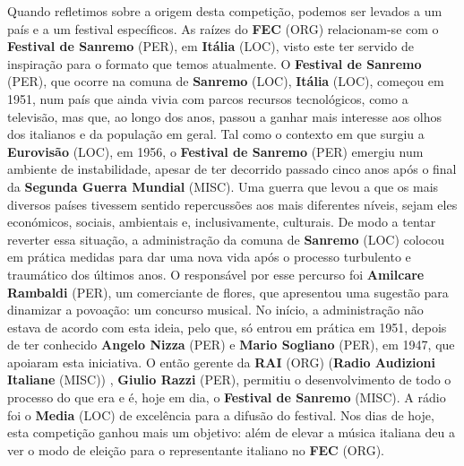\documentclass[12pt,a4paper]{article}
\begin{document}
Quando refletimos sobre a origem desta competição, podemos ser levados a um país e a um festival específicos. As raízes do \textbf{FEC} (ORG) relacionam-se com o \textbf{Festival de Sanremo} (PER), em  \textbf{Itália} (LOC), visto este ter  servido de inspiração para o formato que temos atualmente. O \textbf{Festival de Sanremo} (PER), que ocorre na comuna de \textbf{Sanremo} (LOC), \textbf{Itália} (LOC), começou em 1951, num país  que  ainda  vivia  com  parcos  recursos  tecnológicos,  como  a  televisão,  mas  que,  ao longo dos anos, passou a ganhar mais interesse aos olhos dos italianos e da população em geral. Tal como o contexto em que surgiu a \textbf{Eurovisão} (LOC), em 1956, o \textbf{Festival de Sanremo} (PER) emergiu num ambiente de instabilidade, apesar de ter decorrido passado cinco anos após o final da \textbf{Segunda Guerra Mundial} (MISC). Uma guerra que levou a que os mais diversos países tivessem sentido repercussões aos mais diferentes níveis, sejam eles económicos, sociais, ambientais  e,  inclusivamente,  culturais.  De  modo  a  tentar  reverter  essa  situação,  a administração da comuna de \textbf{Sanremo} (LOC)  colocou em  prática medidas para  dar uma nova vida após o processo turbulento e traumático dos últimos anos. O responsável por esse percurso foi \textbf{Amilcare Rambaldi} (PER), um comerciante de flores, que apresentou uma sugestão para dinamizar a povoação: um concurso musical. No início, a administração não estava de acordo com esta ideia, pelo que, só entrou em prática em 1951, depois de ter conhecido \textbf{Angelo Nizza} (PER) e \textbf{Mario Sogliano} (PER), em 1947, que apoiaram esta iniciativa. O então gerente da \textbf{RAI} (ORG) (\textbf{Radio Audizioni Italiane} (MISC)) , \textbf{Giulio Razzi} (PER), permitiu o desenvolvimento de todo o processo  do  que  era  e  é,  hoje  em  dia,  o  \textbf{Festival  de  Sanremo} (MISC).  A  rádio  foi  o \textbf{Media} (LOC) de excelência para a difusão do festival. Nos dias de hoje, esta competição ganhou mais um objetivo: além de elevar a música italiana deu a ver o modo de eleição para o representante italiano no \textbf{FEC} (ORG).
\end{document}
